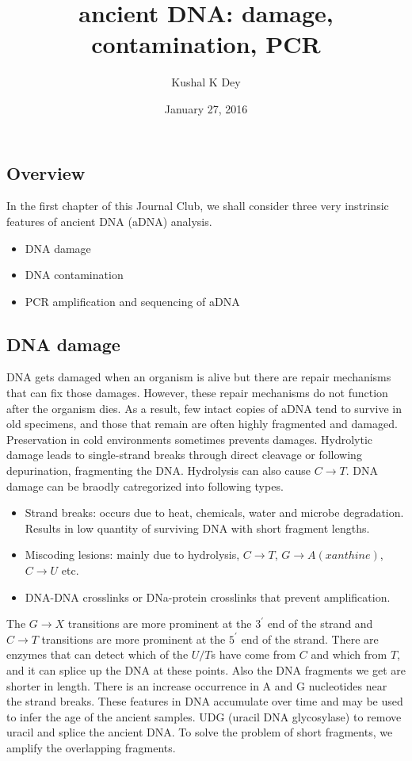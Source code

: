 \documentclass[]{article}
\title{ancient DNA: damage, contamination, PCR}
\author{Kushal K Dey}
\date{January 27, 2016}
\begin{document}
\maketitle


\subsection{Overview}\label{overview}

In the first chapter of this Journal Club, we shall consider three very
instrinsic features of ancient DNA (aDNA) analysis.

\begin{itemize}
\item DNA damage
\item DNA contamination 
\item PCR amplification and sequencing of aDNA 
\end{itemize}

\subsection{DNA damage}\label{dna-damage}

DNA gets damaged when an organism is alive but there are repair
mechanisms that can fix those damages. However, these repair mechanisms
do not function after the organism dies. As a result, few intact copies
of aDNA tend to survive in old specimens, and those that remain are
often highly fragmented and damaged. Preservation in cold environments
sometimes prevents damages. Hydrolytic damage leads to single-strand
breaks through direct cleavage or following depurination, fragmenting
the DNA. Hydrolysis can also cause \(C \rightarrow T\). DNA damage can
be braodly catregorized into following types.

\begin{itemize}
\item Strand breaks: occurs due to heat, chemicals, water and microbe degradation. Results in low quantity of surviving DNA with short fragment lengths. 
\item Miscoding lesions: mainly due to hydrolysis, $C \rightarrow T$, $G \rightarrow A (xanthine)$, $C \rightarrow U$ etc. 
\item DNA-DNA crosslinks or DNa-protein crosslinks that prevent amplification.
\end{itemize}

The \(G \rightarrow X\) transitions are more prominent at the \(3^{'}\)
end of the strand and \(C \rightarrow T\) transitions are more prominent
at the \(5^{'}\) end of the strand. There are enzymes that can detect
which of the \(U/T\)s have come from \(C\) and which from \(T\), and it
can splice up the DNA at these points. Also the DNA fragments we get are
shorter in length. There is an increase occurrence in A and G
nucleotides near the strand breaks. These features in DNA accumulate
over time and may be used to infer the age of the ancient samples. UDG
(uracil DNA glycosylase) to remove uracil and splice the ancient DNA. To
solve the problem of short fragments, we amplify the overlapping
fragments.
\end{document}
